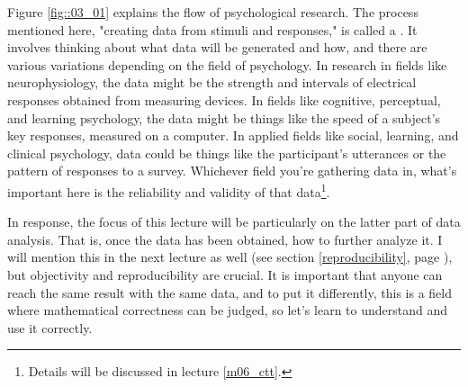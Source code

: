 \documentclass{ltjsbook}
\begin{document}
Figure \ref{fig::03_01} explains the flow of psychological research. The process mentioned here, "creating data from stimuli and responses," is called a . It involves thinking about what data will be generated and how, and there are various variations depending on the field of psychology. In research in fields like neurophysiology, the data might be the strength and intervals of electrical responses obtained from measuring devices. In fields like cognitive, perceptual, and learning psychology, the data might be things like the speed of a subject's key responses, measured on a computer. In applied fields like social, learning, and clinical psychology, data could be things like the participant's utterances or the pattern of responses to a survey. Whichever field you're gathering data in, what's important here is the reliability and validity of that data\footnote{Details will be discussed in lecture \ref{m06_ctt}.}.



In response, the focus of this lecture will be particularly on the latter part of data analysis. That is, once the data has been obtained, how to further analyze it. I will mention this in the next lecture as well (see section \ref{reproducibility}, page \pageref{reproducibility}), but objectivity and reproducibility are crucial. It is important that anyone can reach the same result with the same data, and to put it differently, this is a field where mathematical correctness can be judged, so let's learn to understand and use it correctly.
\end{document}
